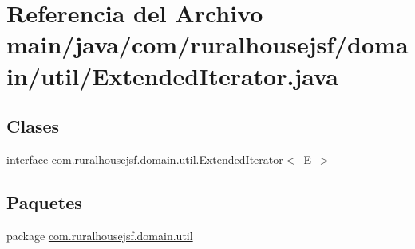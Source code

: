 \hypertarget{a00050}{}\section{Referencia del Archivo main/java/com/ruralhousejsf/domain/util/\+Extended\+Iterator.java}
\label{a00050}
\subsection*{Clases}
\begin{DoxyCompactItemize}
\item 
interface \mbox{\hyperlink{a00192}{com.\+ruralhousejsf.\+domain.\+util.\+Extended\+Iterator$<$ E $>$}}
\end{DoxyCompactItemize}
\subsection*{Paquetes}
\begin{DoxyCompactItemize}
\item 
package \mbox{\hyperlink{a00117}{com.\+ruralhousejsf.\+domain.\+util}}
\end{DoxyCompactItemize}
